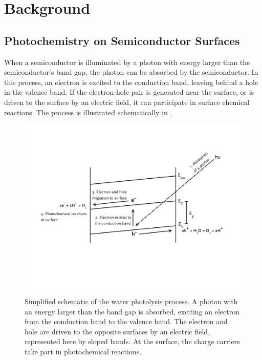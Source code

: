 

\chapter{Background}
\label{ch:background}


\section{Photochemistry on Semiconductor Surfaces}
\label{sec:background.semiconductorphotochem}

When a semiconductor is illuminated by a photon with energy larger than the
semiconductor's band gap, the photon can be absorbed by the
semiconductor.\cite{Morrison:1980va} In this process, an electron is excited to the
conduction band, leaving behind a hole in the valence band. If the electron-hole pair is
generated near the surface, or is driven to the surface by an electric field, it can
participate in surface chemical reactions. The process is illustrated schematically in
.

\begin{figure}
	\includegraphics[width=\textwidth]{photochemsteps.pdf}
	\caption[Simplified schematic of the water photolysis process]{%
		Simplified schematic of the water photolysis process. A photon 
		with an energy larger than the band gap is absorbed, exciting 
		an electron from the conduction band to the valence band. The 
		electron and hole are driven to the opposite surfaces by an electric field, 
		represented here by sloped bands. At the surface, the charge 
		carriers take part in photochemical reactions.}
	\label{fig:photochemsteps}
\end{figure}

